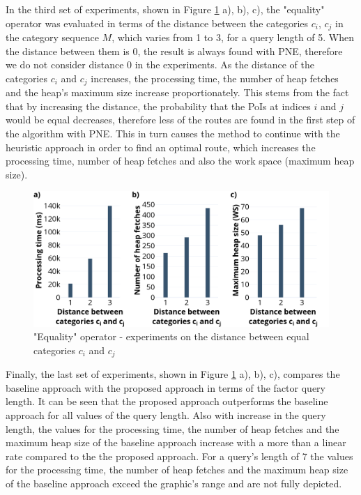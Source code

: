 In the third set of experiments, shown in Figure \ref{fig:eo_distance} a), b), c), the "equality" operator was evaluated in terms of the  distance between the categories $c_i$, $c_j$ in the category sequence $M$, which varies from 1 to 3, for a query length of 5. When the distance between them is 0, the result is always found with PNE, therefore we do not consider distance 0 in the experiments. As the distance of the categories $c_i$ and $c_j$ increases, the processing time, the number of heap fetches and the heap's maximum size increase proportionately. This stems from the fact that by increasing the distance, the probability that the PoIs at indices $i$ and $j$ would be equal decreases, therefore less of the routes are found in the first step of the algorithm with PNE. This in turn causes the method to continue with the heuristic approach in order to find an optimal route, which increases the processing time, number of heap fetches and also the work space (maximum heap size).

\begin{figure}[h!]
	\includegraphics[scale=0.33]{images/eo_distance_30.png}
	\centering
	\caption{"Equality" operator - experiments on the distance between equal categories $c_i$ and $c_j$}
	\label{fig:eo_distance}
\end{figure}

Finally, the last set of experiments, shown in Figure \ref{fig:eo_distance} a), b), c), compares the baseline approach with the proposed approach in terms of the factor query length. It can be seen that the proposed approach outperforms the baseline approach for all values of the query length. Also with increase in the query length, the values for the processing time, the number of heap fetches and the maximum heap size of the baseline approach increase with a more than a linear rate compared to the the proposed approach. For a query's length of 7 the values for the processing time, the number of heap fetches and the maximum heap size of the baseline approach exceed the graphic's range and are not fully depicted.

